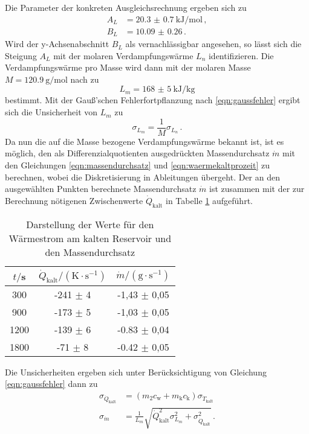 Die Parameter der konkreten Ausgleichsrechnung ergeben sich zu
\begin{align*}
  A_L &= \SI{20.3(07)}{\kilo\joule\per\mol}\,, \\
  B_L &= \SI{10.09(026)} \,.
\end{align*}
Wird der y-Achsenabschnitt $B_L$ als vernachlässigbar angesehen, so lässt sich die
Steigung $A_L$ mit der molaren Verdampfungswärme $L_n$ identifizieren.
Die Verdampfungswärme pro Masse wird dann mit der molaren Masse $M = \SI{120.9}{\gram\per\mol}$
nach \cite{molaremasse} zu
\begin{equation*}
  L_m = \SI{168(5)}{\kilo\joule\per\kilogram}
\end{equation*}
bestimmt. Mit der Gauß'schen Fehlerfortpflanzung nach \eqref{eqn:gaussfehler} ergibt sich
die Unsicherheit von $L_m$ zu
\begin{equation*}
  \sigma_{L_m} = \frac{1}{M} \sigma_{L_n}\,.
\end{equation*}
Da nun die auf die Masse bezogene Verdampfungswärme bekannt ist, ist es möglich, den
als Differenzialquotienten ausgedrückten Massendurchsatz $\dot{m}$ mit den Gleichungen
\eqref{eqn:massendurchsatz} und \eqref{eqn:waermekaltprozeit} zu berechnen, wobei die
Diskretisierung in Ableitungen übergeht.
Der an den ausgewählten Punkten berechnete Massendurchsatz $\dot{m}$ ist zusammen mit
der zur Berechnung nötigenen Zwischenwerte $\dot{Q}_\text{kalt}$ in Tabelle
\ref{tab:tabmassendurchsatz} aufgeführt.
\begin{table}
		\centering
    \caption{Darstellung der Werte für den Wärmestrom am kalten Reservoir und den Massendurchsatz}
    \label{tab:tabmassendurchsatz}
		\begin{tabular}{ccc}
			\toprule
			$t/$s & $\dot{Q}_\text{kalt}/(\text{K} \cdot \text{s}^{-1})$ & $\dot{m}/(\text{g} \cdot \text{s}^{-1})$ \\
			\midrule
      300  & -241 $\pm$ 4 & -1,43 $\pm$ 0,05 \\
      900  & -173 $\pm$ 5 & -1,03 $\pm$ 0,05 \\
      1200 & -139 $\pm$ 6 & -0.83 $\pm$ 0,04 \\
      1800 &  -71  $\pm$ 8 & -0.42 $\pm$ 0,05 \\
			\bottomrule
		\end{tabular}
	\end{table}
Die Unsicherheiten ergeben sich unter Berücksichtigung von Gleichung \eqref{eqn:gaussfehler} dann zu
\begin{align*}
  \sigma_{\dot{Q}_\text{kalt}} &= (m_2 c_\text{w} + m_\text{k} c_\text{k}) \sigma_{\dot{T}_\text{kalt}} \\
  \sigma_{\dot{m}} &= \frac{1}{L_m} \sqrt{\dot{Q}_\text{kalt}^2 \sigma_{L_m}^2 + \sigma_{\dot{Q}_\text{kalt}}^2}\,.
\end{align*}

